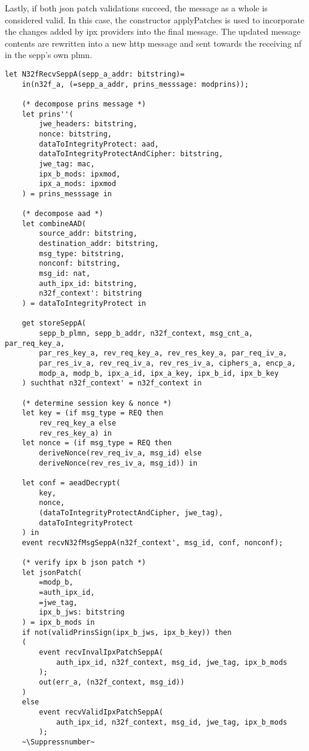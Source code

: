 Lastly, if both \gls{json} patch validations succeed, the message as a whole is considered valid.
In this case, the constructor {\sffamily applyPatches} is used to incorporate the changes added by \gls{ipx} providers into the final message.
The updated message contents are rewritten into a new \gls{http} message and sent towards the receiving \gls{nf} in the \gls{sepp}'s own \gls{plmn}.

\lstset{escapeinside=~~}
\begin{lstlisting}[caption={Definition of the receiving N32-f signaling transmission process},label={lst:n32f-recv},firstnumber=846]
let N32fRecvSeppA(sepp_a_addr: bitstring)=
    in(n32f_a, (=sepp_a_addr, prins_messsage: modprins));

    (* decompose prins message *)
    let prins''(
        jwe_headers: bitstring,
        nonce: bitstring,
        dataToIntegrityProtect: aad,
        dataToIntegrityProtectAndCipher: bitstring,
        jwe_tag: mac,
        ipx_b_mods: ipxmod,
        ipx_a_mods: ipxmod
    ) = prins_messsage in

    (* decompose aad *)
    let combineAAD(
        source_addr: bitstring,
        destination_addr: bitstring,
        msg_type: bitstring,
        nonconf: bitstring,
        msg_id: nat,
        auth_ipx_id: bitstring,
        n32f_context': bitstring
    ) = dataToIntegrityProtect in

    get storeSeppA(
        sepp_b_plmn, sepp_b_addr, n32f_context, msg_cnt_a, par_req_key_a,
        par_res_key_a, rev_req_key_a, rev_res_key_a, par_req_iv_a,
        par_res_iv_a, rev_req_iv_a, rev_res_iv_a, ciphers_a, encp_a,
        modp_a, modp_b, ipx_a_id, ipx_a_key, ipx_b_id, ipx_b_key
    ) suchthat n32f_context' = n32f_context in

    (* determine session key & nonce *)
    let key = (if msg_type = REQ then
        rev_req_key_a else
        rev_res_key_a) in
    let nonce = (if msg_type = REQ then
        deriveNonce(rev_req_iv_a, msg_id) else
        deriveNonce(rev_res_iv_a, msg_id)) in

    let conf = aeadDecrypt(
        key,
        nonce,
        (dataToIntegrityProtectAndCipher, jwe_tag),
        dataToIntegrityProtect
    ) in
    event recvN32fMsgSeppA(n32f_context', msg_id, conf, nonconf);

    (* verify ipx b json patch *)
    let jsonPatch(
        =modp_b,
        =auth_ipx_id,
        =jwe_tag,
        ipx_b_jws: bitstring
    ) = ipx_b_mods in
    if not(validPrinsSign(ipx_b_jws, ipx_b_key)) then
    (
        event recvInvalIpxPatchSeppA(
            auth_ipx_id, n32f_context, msg_id, jwe_tag, ipx_b_mods
        );
        out(err_a, (n32f_context, msg_id))
    )
    else
        event recvValidIpxPatchSeppA(
            auth_ipx_id, n32f_context, msg_id, jwe_tag, ipx_b_mods
        );
    ~\Suppressnumber~


\end{lstlisting}
